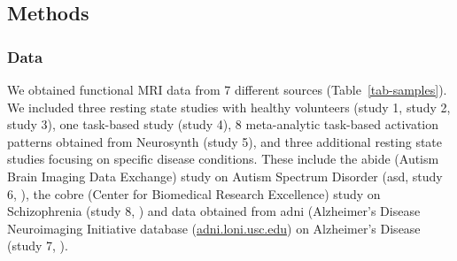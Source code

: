 \documentclass{article}
\begin{document}
\subsection{Methods}\label{Methods}

\subsubsection{Data}\label{Data}

We obtained functional MRI data from 7 different sources (Table~\ref{tab-samples}).
We included three resting state studies with healthy volunteers (study 1, study 2, study 3), one task-based study (study 4), 8 meta-analytic task-based activation patterns obtained from Neurosynth (study 5), and three additional resting state studies focusing on specific disease conditions. These include the \acrshort{abide} (Autism Brain Imaging Data Exchange) study on Autism Spectrum Disorder (\acrshort{asd}, study 6, \cite{di2014autism}), the \acrshort{cobre} (Center for Biomedical Research Excellence) study on Schizophrenia (study 8, \citep{aine2017multimodal}) and data obtained from \acrshort{adni} (Alzheimer's Disease Neuroimaging Initiative database (\href{http://adni.loni.usc.edu}{adni.loni.usc.edu}) on Alzheimer's Disease (study 7, \citep{petersen2010alzheimer}).
\end{document}
